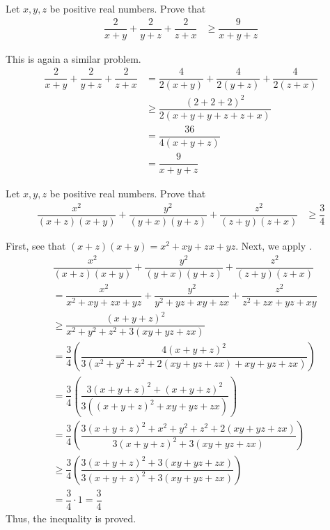 \documentclass{subfile}
\begin{document}
		\begin{problem}
			Let $x,y,z$ be positive real numbers. Prove that
				\begin{align*}
					\dfrac{2}{x+y}+\dfrac{2}{y+z}+\dfrac{2}{z+x}
						& \geq \dfrac{9}{x+y+z}
				\end{align*}

				\begin{solution}
					This is again a similar problem.
						\begin{align*}
							\dfrac{2}{x+y}+\dfrac{2}{y+z}+\dfrac{2}{z+x}
								& = \dfrac{4}{2(x+y)}+\dfrac{4}{2(y+z)}+\dfrac{4}{2(z+x)}\\
								& \geq \dfrac{(2+2+2)^{2}}{2(x+y+y+z+z+x)}\\
								& = \dfrac{36}{4(x+y+z)}\\
								& = \dfrac{9}{x+y+z}
						\end{align*}
				\end{solution}
		\end{problem}

		\begin{problem}
			Let $x,y,z$ be positive real numbers. Prove that
				\begin{align*}
					\dfrac{x^{2}}{(x+z)(x+y)}+\dfrac{y^{2}}{(y+x)(y+z)}+\dfrac{z^{2}}{(z+y)(z+x)}
						& \geq \dfrac{3}{4}
				\end{align*}

				\begin{solution}
					First, see that $(x+z)(x+y)=x^{2}+xy+zx+yz$. Next, we apply \nameref{thm:engel}.
						\begin{align*}
								& \dfrac{x^{2}}{(x+z)(x+y)}+\dfrac{y^{2}}{(y+x)(y+z)}+\dfrac{z^{2}}{(z+y)(z+x)}\\
								& = \dfrac{x^{2}}{x^{2}+xy+zx+yz}+\dfrac{y^{2}}{y^{2}+yz+xy+zx}+\dfrac{z^{2}}{z^{2}+zx+yz+xy}\\
								& \geq \dfrac{(x+y+z)^{2}}{x^{2}+y^{2}+z^{2}+3(xy+yz+zx)}\\
								& = \dfrac{3}{4}\left(\dfrac{4(x+y+z)^{2}}{3(x^{2}+y^{2}+z^{2}+2(xy+yz+zx)+xy+yz+zx)}\right)\\
								& = \dfrac{3}{4}\left(\dfrac{3(x+y+z)^{2}+(x+y+z)^{2}}{3((x+y+z)^{2}+xy+yz+zx)}\right)\\
								& = \dfrac{3}{4}\left(\dfrac{3(x+y+z)^{2}+x^{2}+y^{2}+z^{2}+2(xy+yz+zx)}{3(x+y+z)^{2}+3(xy+yz+zx)}\right)\\
								& \geq \dfrac{3}{4}\left(\dfrac{3(x+y+z)^{2}+3(xy+yz+zx)}{3(x+y+z)^{2}+3(xy+yz+zx)}\right)\\
								& = \dfrac{3}{4}\cdot1=\dfrac{3}{4}
						\end{align*}
					Thus, the inequality is proved.
				\end{solution}
		\end{problem}
\end{document}
